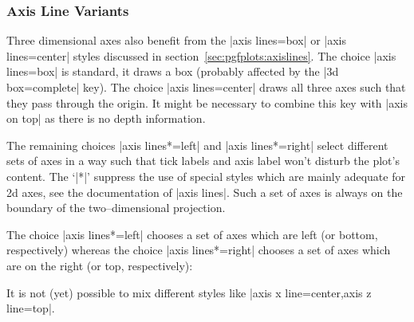 


\subsubsection{Axis Line Variants}
\label{sec:pgfplots:axislines:3d}
Three dimensional axes also benefit from the |axis lines=box| or |axis lines=center| styles discussed in section~\ref{sec:pgfplots:axislines}. The choice |axis lines=box| is standard, it draws a box (probably affected by the |3d box=complete| key). 
The choice |axis lines=center| draws all three axes such that they pass through the origin. It might be necessary to combine this key with |axis on top| as there is no depth information.

\begin{codeexample}[]
\end{codeexample}

The remaining choices |axis lines*=left| and |axis lines*=right| select different sets of axes in a way such that tick labels and axis label won't disturb the plot's content. The `|*|' suppress the use of special styles which are mainly adequate for 2d axes, see the documentation of |axis lines|. Such a set of axes is always on the boundary of the two--dimensional projection.  

The choice |axis lines*=left| chooses a set of axes which are left (or bottom, respectively) whereas the choice |axis lines*=right| chooses a set of axes which are on the right (or top, respectively):

\begin{codeexample}[]
\end{codeexample}

\begin{codeexample}[]
\end{codeexample}

It is not (yet) possible to mix different styles like |axis x line=center,axis z line=top|.

